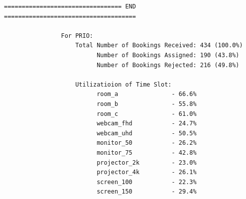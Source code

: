 \documentclass{article}
\begin{document}
\begin{Verbatim}[gobble=8]
                ================================= END =====================================
                
                For PRIO:
                    Total Number of Bookings Received: 434 (100.0%)
                          Number of Bookings Assigned: 190 (43.8%)
                          Number of Bookings Rejected: 216 (49.8%)
                
                    Utilizatioion of Time Slot:
                          room_a               - 66.6%
                          room_b               - 55.8%
                          room_c               - 61.0%
                          webcam_fhd           - 24.7%
                          webcam_uhd           - 50.5%
                          monitor_50           - 26.2%
                          monitor_75           - 42.8%
                          projector_2k         - 23.0%
                          projector_4k         - 26.1%
                          screen_100           - 22.3%
                          screen_150           - 29.4%
                

\end{Verbatim}
\end{document}
